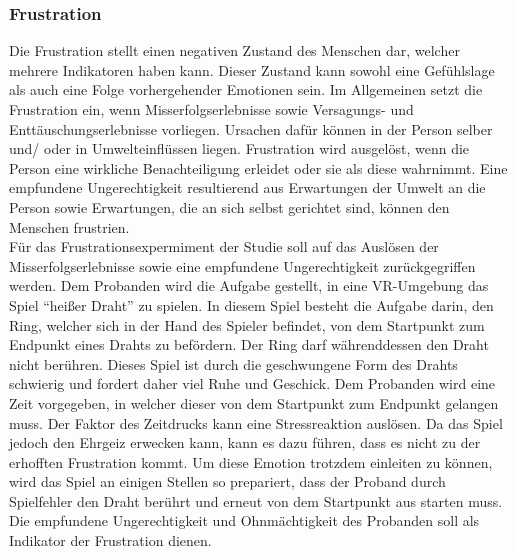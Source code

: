\subsubsection{Frustration} \label{frust-1}



Die Frustration stellt einen negativen Zustand des Menschen dar, welcher mehrere Indikatoren haben kann. Dieser Zustand kann sowohl eine Gefühlslage als auch eine Folge vorhergehender Emotionen sein.
Im Allgemeinen setzt die Frustration ein, wenn Misserfolgserlebnisse sowie Versagungs- und Enttäuschungserlebnisse vorliegen. Ursachen dafür können in der Person selber und/ oder in Umwelteinflüssen liegen. 
Frustration wird ausgelöst, wenn die Person eine wirkliche Benachteiligung erleidet oder sie als diese wahrnimmt. Eine empfundene Ungerechtigkeit resultierend aus Erwartungen der Umwelt an die Person sowie Erwartungen, die an sich selbst gerichtet sind, können den Menschen frustrien. \\

Für das Frustrationsexpermiment der Studie soll auf das Auslösen der Misserfolgserlebnisse sowie eine empfundene Ungerechtigkeit zurückgegriffen werden.
Dem Probanden wird die Aufgabe gestellt, in eine VR-Umgebung das Spiel ``heißer Draht'' zu spielen. In diesem Spiel besteht die Aufgabe darin, den Ring, welcher sich in der Hand des Spieler befindet, von dem Startpunkt zum Endpunkt eines Drahts zu befördern. Der Ring darf währenddessen den Draht nicht berühren.
Dieses Spiel ist durch die geschwungene Form des Drahts schwierig und fordert daher viel Ruhe und Geschick. 
Dem Probanden wird eine Zeit vorgegeben, in welcher dieser von dem Startpunkt zum Endpunkt gelangen muss. 
Der Faktor des Zeitdrucks kann eine Stressreaktion auslösen. Da das Spiel jedoch den Ehrgeiz erwecken kann, kann es dazu führen, dass es nicht zu der erhofften Frustration kommt. Um diese Emotion trotzdem einleiten zu können, wird das Spiel an einigen Stellen so prepariert, dass der Proband durch Spielfehler den Draht berührt und erneut von dem Startpunkt aus starten muss. Die empfundene Ungerechtigkeit und Ohnmächtigkeit des Probanden soll als Indikator der Frustration dienen. 
